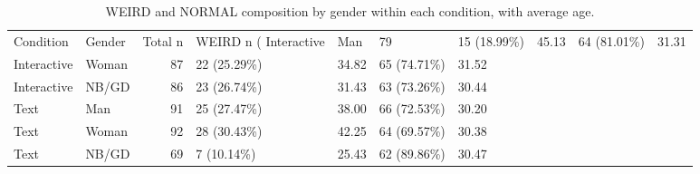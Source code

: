 \begin{table}
\caption{WEIRD and NORMAL composition by gender within each condition, with average age.}
\label{tab:weird-normal-gender-condition}
\begin{tabular}{llrllll}
\toprule
Condition & Gender & Total n & WEIRD n (%
\midrule
Interactive & Man & 79 & 15 (18.99\%) & 45.13 & 64 (81.01\%) & 31.31 \\
Interactive & Woman & 87 & 22 (25.29\%) & 34.82 & 65 (74.71\%) & 31.52 \\
Interactive & NB/GD & 86 & 23 (26.74\%) & 31.43 & 63 (73.26\%) & 30.44 \\
Text & Man & 91 & 25 (27.47\%) & 38.00 & 66 (72.53\%) & 30.20 \\
Text & Woman & 92 & 28 (30.43\%) & 42.25 & 64 (69.57\%) & 30.38 \\
Text & NB/GD & 69 & 7 (10.14\%) & 25.43 & 62 (89.86\%) & 30.47 \\
\bottomrule
\end{tabular}
\end{table}
